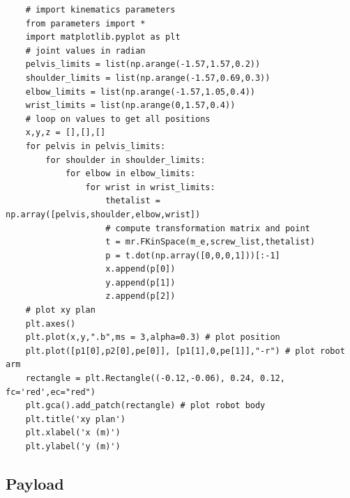 \begin{verbatim}
    # import kinematics parameters
    from parameters import * 
    import matplotlib.pyplot as plt
    # joint values in radian
    pelvis_limits = list(np.arange(-1.57,1.57,0.2))
    shoulder_limits = list(np.arange(-1.57,0.69,0.3))
    elbow_limits = list(np.arange(-1.57,1.05,0.4))
    wrist_limits = list(np.arange(0,1.57,0.4))
    # loop on values to get all positions
    x,y,z = [],[],[]
    for pelvis in pelvis_limits:
        for shoulder in shoulder_limits:
            for elbow in elbow_limits:
                for wrist in wrist_limits:
                    thetalist = np.array([pelvis,shoulder,elbow,wrist])
                    # compute transformation matrix and point
                    t = mr.FKinSpace(m_e,screw_list,thetalist)
                    p = t.dot(np.array([0,0,0,1]))[:-1]
                    x.append(p[0])
                    y.append(p[1])
                    z.append(p[2])
    # plot xy plan
    plt.axes()
    plt.plot(x,y,".b",ms = 3,alpha=0.3) # plot position
    plt.plot([p1[0],p2[0],pe[0]], [p1[1],0,pe[1]],"-r") # plot robot arm
    rectangle = plt.Rectangle((-0.12,-0.06), 0.24, 0.12, fc='red',ec="red") 
    plt.gca().add_patch(rectangle) # plot robot body
    plt.title('xy plan')
    plt.xlabel('x (m)')
    plt.ylabel('y (m)')
    \end{verbatim}

\subsection{Payload}

